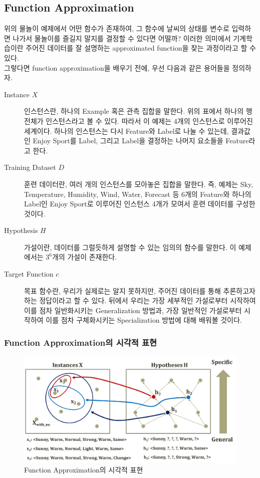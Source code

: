 \documentclass[a4paper]{oblivoir}
\begin{document}
\subsection{Function Approximation}
위의 물놀이 예제에서 어떤 함수가 존재하여, 그 함수에 날씨의 상태를 변수로 입력하면 나가서 물놀이를 즐길지 말지를 결정할 수 있다면 어떨까? 이러한 의미에서 기계학습이란 주어진 데이터를 잘 설명하는 approximated function을 찾는 과정이라고 할 수 있다. \\
\indent 그렇다면 function approximation을 배우기 전에, 우선 다음과 같은 용어들을 정의하자.
\begin{description}
\item [Instance $X$] 인스턴스란, 하나의 Example 혹은 관측 집합을 말한다. 위의 표에서 하나의 행 전체가 인스턴스라고 볼 수 있다. 따라서 이 예제는 4개의 인스턴스로 이루어진 세계이다. 하나의 인스턴스는 다시 Feature와 Label로 나눌 수 있는데, 결과값인 Enjoy Sport를 Label, 그리고 Label을 결정하는 나머지 요소들을 Feature라고 한다. 
\item [Training Dataset $D$] 훈련 데이터란, 여러 개의 인스턴스를 모아놓은 집합을 말한다. 즉, 예제는 Sky, Temperature, Humidity, Wind, Water, Forecast 등 6개의 Feature와 하나의 Label인 Enjoy Sport로 이루어진 인스턴스 4개가 모여서 훈련 데이터를 구성한 것이다.
\item [Hypothesis $H$] 가설이란, 데이터를 그럴듯하게 설명할 수 있는 임의의 함수를 말한다. 이 예제에서는 $3^{6}$개의 가설이 존재한다.
\item [Target Function $c$] 목표 함수란, 우리가 실제로는 알지 못하지만, 주어진 데이터를 통해 추론하고자 하는 정답이라고 할 수 있다. 뒤에서 우리는 가장 세부적인 가설로부터 시작하여 이를 점차 일반화시키는 Generalization 방법과, 가장 일반적인 가설로부터 시작하여 이를 점차 구체화시키는 Specialization 방법에 대해 배워볼 것이다. \\
\end{description}

\subsubsection{Function Approximation의 시각적 표현}
\begin{figure}[ht]
\centering
\includegraphics[scale=0.5]{Function_Approximation1.png}
\caption{Function Approximation의 시각적 표현}
\label{Figure 2-2}
\end{figure}
\end{document}
